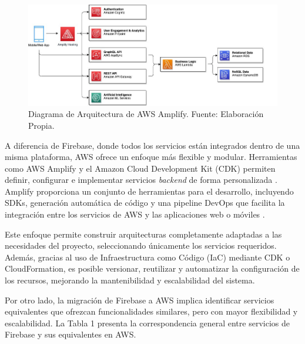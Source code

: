 \begin{figure}[H]
  \centering
  \includegraphics[width=1\textwidth]{img/figures/fig4-amplify-architecture.png}
  \caption{Diagrama de Arquitectura de AWS Amplify. Fuente: Elaboración Propia.}
  \label{fig:amplify_architecture}
\end{figure}

A diferencia de Firebase, donde todos los servicios están integrados dentro de una misma plataforma, AWS ofrece un enfoque más flexible y modular. Herramientas como AWS Amplify y el Amazon Cloud Development Kit (CDK) permiten definir, configurar e implementar servicios \textit{backend} de forma personalizada \cite{Michael2021}. Amplify proporciona un conjunto de herramientas para el desarrollo, incluyendo SDKs, generación automática de código y una pipeline DevOps que facilita la integración entre los servicios de AWS y las aplicaciones web o móviles \cite{Michael2021}.

Este enfoque permite construir arquitecturas completamente adaptadas a las necesidades del proyecto, seleccionando únicamente los servicios requeridos. Además, gracias al uso de Infraestructura como Código (IaC) mediante CDK o CloudFormation, es posible versionar, reutilizar y automatizar la configuración de los recursos, mejorando la mantenibilidad y escalabilidad del sistema.

Por otro lado, la migración de Firebase a AWS implica identificar servicios equivalentes que ofrezcan funcionalidades similares, pero con mayor flexibilidad y escalabilidad. La Tabla 1 presenta la correspondencia general entre servicios de Firebase y sus equivalentes en AWS.
